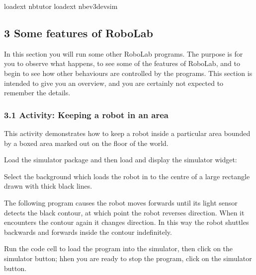 \documentclass[letterpaper,10pt,english]{sphinxmanual}
\begin{document}
{
\begin{sphinxVerbatim}[commandchars=\\\{\}]
\llap{\color{nbsphinxin}[ ]:\,\hspace{\fboxrule}\hspace{\fboxsep}}\PYGZpc{}load\PYGZus{}ext nbtutor
\PYGZpc{}load\PYGZus{}ext nbev3devsim
\end{sphinxVerbatim}
}


\subsection{3 Some features of RoboLab}
\label{\detokenize{content/00_SOFTWARE_GUIDE/Section_00_03_quick_practical_tour:3-Some-features-of-RoboLab}}\label{\detokenize{content/00_SOFTWARE_GUIDE/Section_00_03_quick_practical_tour::doc}}
In this section you will run some other RoboLab programs. The purpose is for you to observe what happens, to see some of the features of RoboLab, and to begin to see how other behaviours are controlled by the programs. This section is intended to give you an overview, and you are certainly not expected to remember the details.


\subsubsection{3.1 Activity: Keeping a robot in an area}
\label{\detokenize{content/00_SOFTWARE_GUIDE/Section_00_03_quick_practical_tour:3.1-Activity:-Keeping-a-robot-in-an-area}}
This activity demonstrates how to keep a robot inside a particular area bounded by a boxed area marked out on the floor of the world.

Load the simulator package and then load and display the simulator widget:

Select the  background which loads the robot in to the centre of a large rectangle drawn with thick black lines.

The following  program causes the robot moves forwards until its light sensor detects the black contour, at which point the robot reverses direction. When it encounters the contour again it changes direction. In this way the robot shuttles backwards and forwards inside the contour indefinitely.

Run the code cell to load the program into the simulator, then click on the simulator  button; hhen you are ready to stop the program, click on the simulator  button.
\end{document}
